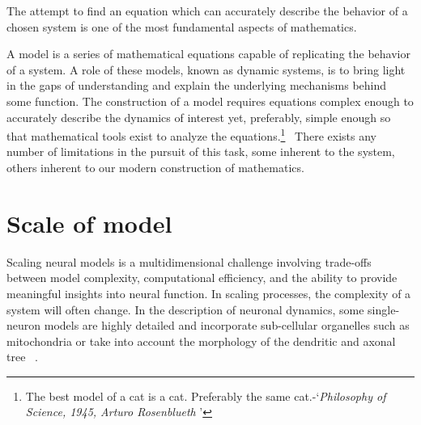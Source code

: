 \documentclass[class={myRUCProject}, crop=false]{standalone}
\begin{document}
The attempt to find an equation which can accurately describe the behavior of a chosen system is one of the most fundamental aspects of mathematics.

A model is a series of mathematical equations capable of replicating the behavior of a system. A role of these models, known as dynamic systems, is to bring light in the gaps of understanding and explain the underlying mechanisms behind some function. 
The construction of a model requires equations complex enough to accurately describe the dynamics of interest yet, preferably, simple enough so that mathematical tools exist to analyze the equations.\footnote{The best model of a cat is a cat. Preferably the same cat\footnotemark.-`\textit{Philosophy of Science, 1945, Arturo Rosenblueth }'}~
There exists any number of limitations in the pursuit of this task, some inherent to the system, others inherent to our modern construction of mathematics.

\section{Scale of model}
Scaling neural models is a multidimensional challenge involving trade-offs between model complexity, computational efficiency, and the ability to provide meaningful insights into neural function.
In scaling processes, the complexity of a system will often change. In the description of neuronal dynamics, some single-neuron models are highly detailed and incorporate sub-cellular organelles such as mitochondria or take into account the morphology of the dendritic and axonal tree ~\cite{Santhakumar2005, Tejada2014}.

\end{document}
